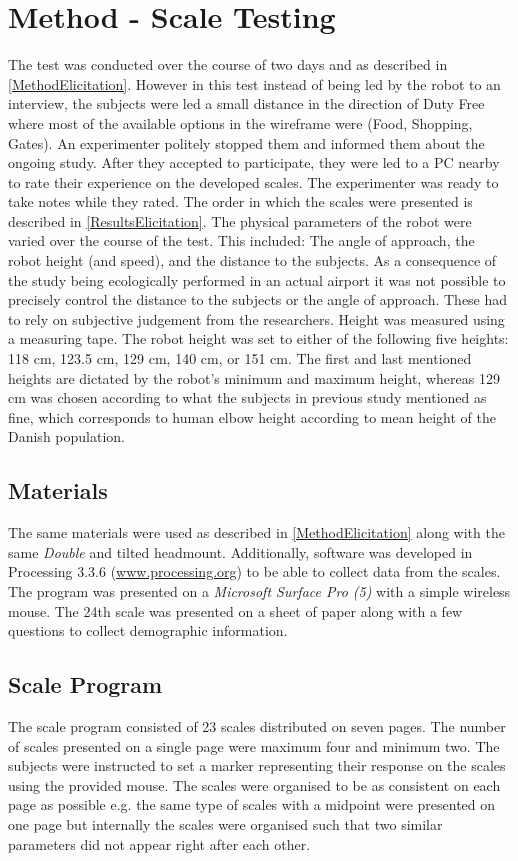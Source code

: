 \section{Method - Scale Testing}
\label{Method2}
The test was conducted over the course of two days and as described in \autoref{MethodElicitation}. However in this test instead of being led by the robot to an interview, the subjects were led a small distance in the direction of Duty Free where most of the available options in the wireframe were (Food, Shopping, Gates). An experimenter politely stopped them and informed them about the ongoing study. After they accepted to participate, they were led to a PC nearby to rate their experience on the developed scales. The experimenter was ready to take notes while they rated. The order in which the scales were presented is described in \autoref{ResultsElicitation}. The physical parameters of the robot were varied over the course of the test. This included: The angle of approach, the robot height (and speed), and the distance to the subjects. As a consequence of the study being ecologically performed in an actual airport it was not possible to precisely control the distance to the subjects or the angle of approach. These had to rely on subjective judgement from the researchers. Height was measured using a measuring tape. The robot height was set to either of the following five heights: 118 cm, 123.5 cm, 129 cm, 140 cm, or 151 cm. The first and last mentioned heights are dictated by the robot's minimum and maximum height, whereas 129 cm was chosen according to what the subjects in previous study mentioned as fine, which corresponds to human elbow height according to mean height of the Danish population. 

\subsection{Materials}
The same materials were used as described in \autoref{MethodElicitation} along with the same \textit{Double} and tilted headmount. Additionally, software was developed in Processing 3.3.6 (\url{www.processing.org}) to be able to collect data from the scales. The program was presented on a \textit{Microsoft Surface Pro (5)} with a simple wireless mouse. The 24th scale was presented on a sheet of paper along with a few questions to collect demographic information.

\subsection{Scale Program}
The scale program consisted of 23 scales distributed on seven pages. The number of scales presented on a single page were maximum four and minimum two. The subjects were instructed to set a marker representing their response on the scales using the provided mouse. The scales were organised to be as consistent on each page as possible e.g. the same type of scales with a midpoint were presented on one page but internally the scales were organised such that two similar parameters did not appear right after each other.

